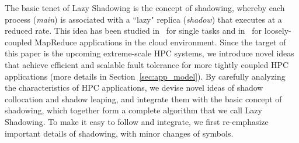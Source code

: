 



The basic tenet of Lazy Shadowing is the concept of shadowing, whereby each process (\textit{main}) is associated with a ``lazy" replica (\textit{shadow}) that executes at a reduced rate. 
This idea has been studied in~\cite{mills_2014_icnc} for single tasks and in~\cite{cui_en7085151,cui_2014_closer} for loosely-coupled MapReduce applications in the cloud environment. 
Since the target of this paper is the upcoming extreme-scale HPC systems, we introduce novel ideas that achieve efficient and scalable fault tolerance for more 
tightly coupled HPC applications (more details in Section~\ref{sec:app_model}). By carefully analyzing the characteristics of HPC applications, we devise novel ideas 
of shadow collocation and shadow leaping, and integrate them with the basic concept of shadowing, which together form a complete algorithm that we call Lazy Shadowing. 
To make it easy to follow and integrate, we first re-emphasize important details of shadowing, with minor changes of symbols.

